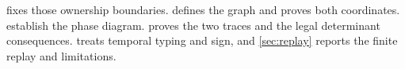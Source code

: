  fixes those ownership boundaries.
 defines the graph and proves both coordinates.
 establish the phase diagram.
 proves the two traces and the legal
determinant consequences.   treats temporal typing
and sign, and \cref{sec:replay} reports the finite replay and limitations.
